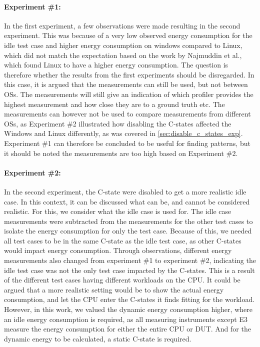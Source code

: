 \paragraph*{Experiment \#1:} In the first experiment, a few observations were made resulting in the second experiment. This was because of a very low observed energy consumption for the idle test case and higher energy consumption on windows compared to Linux, which did not match the expectation based on the work by Najmuddin et al.\cite[]{Najmuddin2021}, which found Linux to have a higher energy consumption. The question is therefore whether the results from the first experiments should be disregarded. In this case, it is argued that the measurements can still be used, but not between OSs. The measurements will still give an indication of which profiler provides the highest measurement and how close they are to a ground truth etc. The measurements can however not be used to compare measurements from different OSs, as Experiment \#2 illustrated how disabling the C-states affected the Windows and Linux differently, as was covered in \cref{sec:disable_c_states_exp}. Experiment \#1 can therefore be concluded to be useful for finding patterns, but it should be noted the measurements are too high based on Experiment \#2.

\paragraph*{Experiment \#2:} In the second experiment, the C-state were disabled to get a more realistic idle case. In this context, it can be discussed what can be, and cannot be considered realistic. For this, we consider what the idle case is used for. The idle case measurements were subtracted from the measurements for the other test cases to isolate the energy consumption for only the test case. Because of this, we needed all test cases to be in the same C-state as the idle test case, as other C-states would impact energy consumption. Through observations, different energy measurements also changed from experiment \#1 to experiment \#2, indicating the idle test case was not the only test case impacted by the C-states. This is a result of the different test cases having different workloads on the CPU. It could be argued that a more realistic setting would be to show the actual energy consumption, and let the CPU enter the C-states it finds fitting for the workload. However, in this work, we valued the dynamic energy consumption higher, where an idle energy consumption is required, as all measuring instruments except E3 measure the energy consumption for either the entire CPU or DUT. And for the dynamic energy to be calculated, a static C-state is required.


